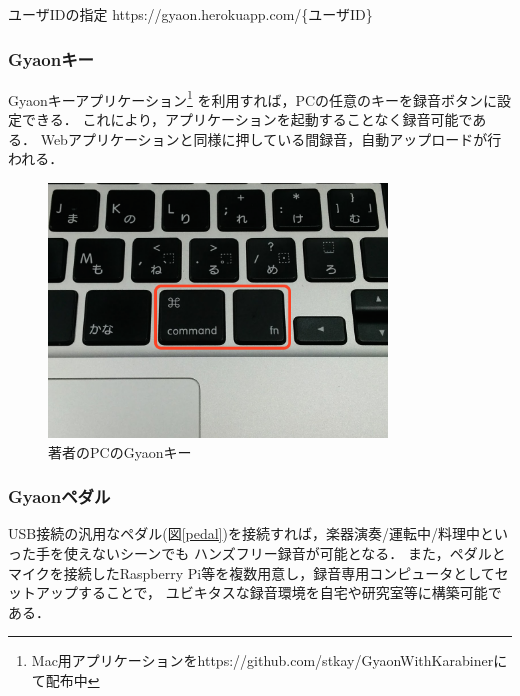 \begin{itembox}[l]
{ユーザIDの指定}
https://gyaon.herokuapp.com/\{ユーザID\}
\end{itembox}

\subsubsection{Gyaonキー}
Gyaonキーアプリケーション\footnote{\textsf{Mac用アプリケーションをhttps://github.com/stkay/GyaonWithKarabinerにて配布中}}
を利用すれば，PCの任意のキーを録音ボタンに設定できる．
これにより，アプリケーションを起動することなく録音可能である．
Webアプリケーションと同様に押している間録音，自動アップロードが行われる．

\begin{figure}[H]
\centering
\includegraphics[width=9cm]{images/key.png}
\caption{著者のPCのGyaonキー}
\label{key}
\end{figure}

\subsubsection{Gyaonペダル}
USB接続の汎用なペダル(図\ref{pedal})を接続すれば，楽器演奏/運転中/料理中といった手を使えないシーンでも
ハンズフリー録音が可能となる．
また，ペダルとマイクを接続したRaspberry Pi等を複数用意し，録音専用コンピュータとしてセットアップすることで，
ユビキタスな録音環境を自宅や研究室等に構築可能である．


